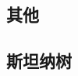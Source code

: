 \documentclass[landscape, twoside, a4paper]{article}
\begin{document}
\begin{multicols}{2}
\begin{spacing}{0.8}




















\section{其他}


\subsection{斯坦纳树}


\end{spacing}
\end{multicols}
\end{document}
